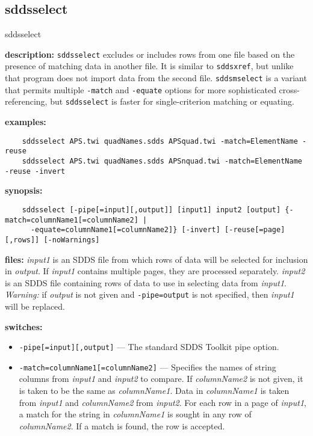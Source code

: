 \newpage
\subsection{sddsselect}
\label{sddsselect}

\begin{sddsprog}{sddsselect}
  \item \textbf{description:} \verb|sddsselect| excludes or includes rows from one file based on the presence of matching data in another file. It is similar to \verb|sddsxref|, but unlike that program does not import data from the second file. \verb|sddsmselect| is a variant that permits multiple \verb|-match| and \verb|-equate| options for more sophisticated cross-referencing, but \verb|sddsselect| is faster for single-criterion matching or equating.
  \item \textbf{examples:}
    \begin{verbatim}
    sddsselect APS.twi quadNames.sdds APSquad.twi -match=ElementName -reuse
    sddsselect APS.twi quadNames.sdds APSnquad.twi -match=ElementName -reuse -invert
    \end{verbatim}
  \item \textbf{synopsis:}
    \begin{verbatim}
    sddsselect [-pipe[=input][,output]] [input1] input2 [output] {-match=columnName1[=columnName2] |
      -equate=columnName1[=columnName2]} [-invert] [-reuse[=page][,rows]] [-noWarnings]
    \end{verbatim}
  \item \textbf{files:} \emph{input1} is an SDDS file from which rows of data will be selected for inclusion in \emph{output}. If \emph{input1} contains multiple pages, they are processed separately. \emph{input2} is an SDDS file containing rows of data to use in selecting data from \emph{input1}. \emph{Warning:} if \emph{output} is not given and \verb|-pipe=output| is not specified, then \emph{input1} will be replaced.
  \item \textbf{switches:}
    \begin{itemize}
      \item \verb|-pipe[=input][,output]| --- The standard SDDS Toolkit pipe option.
      \item \verb|-match=columnName1[=columnName2]| --- Specifies the names of string columns from \emph{input1} and \emph{input2} to compare. If \emph{columnName2} is not given, it is taken to be the same as \emph{columnName1}. Data in \emph{columnName1} is taken from \emph{input1} and \emph{columnName2} from \emph{input2}. For each row in a page of \emph{input1}, a match for the string in \emph{columnName1} is sought in any row of \emph{columnName2}. If a match is found, the row is accepted.

\end{itemize}
\end{sddsprog}

